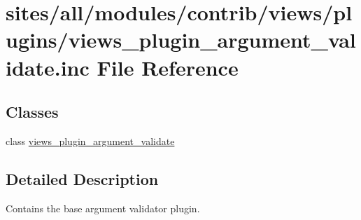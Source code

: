 \hypertarget{views__plugin__argument__validate_8inc}{
\section{sites/all/modules/contrib/views/plugins/views\_\-plugin\_\-argument\_\-validate.inc File Reference}
\label{views__plugin__argument__validate_8inc}
}
\subsection*{Classes}
\begin{CompactItemize}
\item 
class \hyperlink{classviews__plugin__argument__validate}{views\_\-plugin\_\-argument\_\-validate}
\end{CompactItemize}


\subsection{Detailed Description}
Contains the base argument validator plugin. 